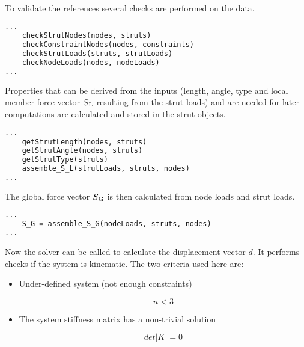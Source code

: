 \pagebreak

To validate the references several checks are performed on the data.

\begin{inconsolata}
\begin{minipage}{\linewidth}
\begin{lstlisting}[language=python]
...
    checkStrutNodes(nodes, struts)
    checkConstraintNodes(nodes, constraints)
    checkStrutLoads(struts, strutLoads)
    checkNodeLoads(nodes, nodeLoads)
...
\end{lstlisting}
\end{minipage}
\end{inconsolata}

Properties that can be derived from the inputs (length, angle, type and local member force vector $S\textsubscript{L}$ resulting from the strut loads) and are needed for later computations are calculated and stored in the strut objects.

\begin{inconsolata}
\begin{minipage}{\linewidth}
\begin{lstlisting}[language=python]
...
    getStrutLength(nodes, struts)
    getStrutAngle(nodes, struts)
    getStrutType(struts)
    assemble_S_L(strutLoads, struts, nodes)
...
\end{lstlisting}
\end{minipage}
\end{inconsolata}

The global force vector $S\textsubscript{G}$ is then calculated from node loads and strut loads.

\begin{inconsolata}
\begin{minipage}{\linewidth}
\begin{lstlisting}[language=python]
...
    S_G = assemble_S_G(nodeLoads, struts, nodes)
...
\end{lstlisting}
\end{minipage}
\end{inconsolata}

Now the solver can be called to calculate the displacement vector $d$.
It performs checks if the system is kinematic. The two criteria used here are:
\begin{itemize}

  \item Under-defined system (not enough constraints)

\begin{equation}
n < 3
\end{equation}

  \item The system stiffness matrix has a non-trivial solution

\begin{equation}
det \lvert K \lvert = 0
\end{equation}

\end{itemize}

